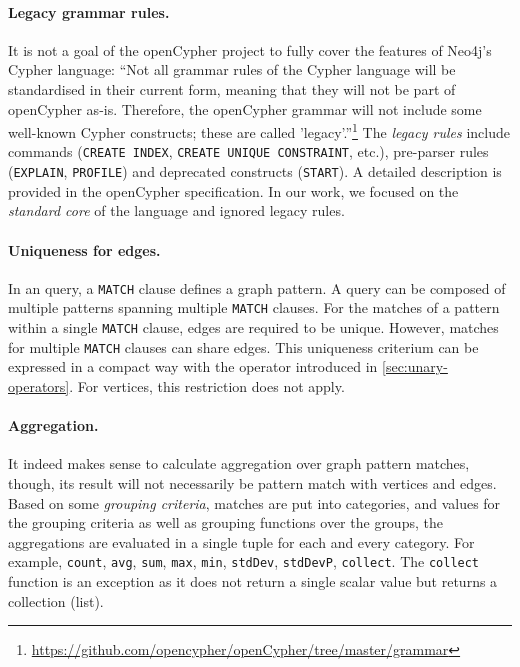 \paragraph{Legacy grammar rules.} It is not a goal of the openCypher project to fully cover the features of Neo4j's Cypher language: ``Not all grammar rules of the Cypher language will be standardised in their current form, meaning that they will not be part of openCypher as-is. Therefore, the openCypher grammar will not include some well-known Cypher constructs; these are called 'legacy'.''\footnote{\url{https://github.com/opencypher/openCypher/tree/master/grammar}} The \emph{legacy rules} include commands (\lstinline+CREATE INDEX+, \lstinline+CREATE UNIQUE CONSTRAINT+, etc.), pre-parser rules (\lstinline+EXPLAIN+, \lstinline+PROFILE+) and deprecated constructs (\lstinline+START+). A detailed description is provided in the openCypher specification. In our work, we focused on the \emph{standard core} of the language and ignored legacy rules.

\paragraph{Uniqueness for edges.} In an \opencypher query, a \lstinline+MATCH+ clause defines a graph pattern. A query can be composed of multiple patterns spanning multiple \lstinline+MATCH+ clauses. For the matches of a pattern within a single \lstinline+MATCH+ clause, edges are required to be unique. %
However, matches for multiple \lstinline+MATCH+ clauses can share edges. This uniqueness criterium can be expressed in a compact way with the \alldifferenttext operator introduced in \autoref{sec:unary-operators}. For vertices, this restriction does not apply.

\paragraph{Aggregation.} It indeed makes sense to calculate aggregation over graph pattern matches, though, its result will not necessarily be pattern match with vertices and edges. Based on some \emph{grouping criteria}, matches are put into categories, and values for the grouping criteria as well as grouping functions over the groups, the aggregations are evaluated in a single tuple for each and every category. For example, \lstinline+count+, \lstinline+avg+, \lstinline+sum+, \lstinline+max+, \lstinline+min+, \lstinline+stdDev+, \lstinline+stdDevP+, \lstinline+collect+. The \lstinline+collect+ function is an exception as it does not return a single scalar value but returns a collection (list).

